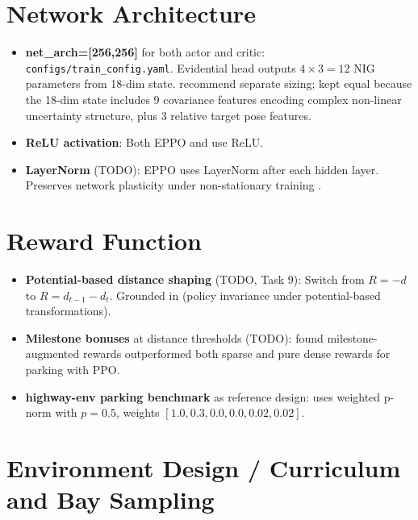\documentclass[11pt,a4paper]{article}
\begin{document}
\section{Network Architecture}

\begin{itemize}[leftmargin=*]
  \item \textbf{net\_arch=[256,256]} for both actor and critic:
        \texttt{configs/train\_config.yaml}.
        Evidential head outputs $4 \times 3 = 12$ NIG parameters from 18-dim state.
        \cite{andrychowicz2021what} recommend separate sizing; kept equal because
        the 18-dim state includes 9 covariance features encoding complex non-linear
        uncertainty structure, plus 3 relative target pose features.

  \item \textbf{ReLU activation}:
        Both EPPO \cite{eppo2024} and \cite{amini2020deep} use ReLU.

  \item \textbf{LayerNorm} (TODO):
        EPPO \cite{eppo2024} uses LayerNorm after each hidden layer.
        Preserves network plasticity under non-stationary training
        \cite{dohare2024loss, lyle2022understanding}.
\end{itemize}

\section{Reward Function}

\begin{itemize}[leftmargin=*]
  \item \textbf{Potential-based distance shaping} (TODO, Task 9):
        Switch from $R = -d$ to $R = d_{t-1} - d_t$.
        Grounded in \cite{ng1999policy} (policy invariance under
        potential-based transformations).

  \item \textbf{Milestone bonuses} at distance thresholds (TODO):
        \cite{rarlap2024} found milestone-augmented rewards outperformed
        both sparse and pure dense rewards for parking with PPO.

  \item \textbf{highway-env parking benchmark} as reference design:
        \cite{highwayenv} uses weighted p-norm with $p = 0.5$,
        weights $[1.0, 0.3, 0.0, 0.0, 0.02, 0.02]$.
\end{itemize}

\section{Environment Design / Curriculum and Bay Sampling}
\end{document}
